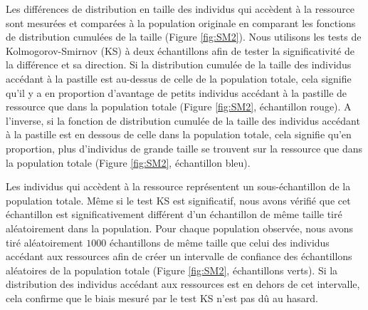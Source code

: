 Les différences de distribution en taille des individus qui accèdent à la
ressource sont mesurées et comparées à la population originale en comparant les
fonctions de distribution cumulées de la taille (Figure \ref{fig:SM2}). Nous
utilisons les tests de Kolmogorov-Smirnov (KS) à deux échantillons afin de
tester la significativité de la différence et sa direction. Si la distribution cumulée
de la taille des individus accédant à la pastille est au-dessus de celle de la
population totale, cela signifie qu'il y a en proportion d'avantage de petits
individus accédant à la pastille de ressource que dans la population totale
(Figure \ref{fig:SM2}, échantillon rouge). A l'inverse, si la fonction de
distribution cumulée de la taille des individus accédant à la pastille est en
dessous de celle dans la population totale, cela signifie qu'en proportion, plus
d'individus de grande taille se trouvent sur la ressource que dans la population
totale (Figure \ref{fig:SM2}, échantillon bleu).

Les individus qui accèdent à la ressource représentent un sous-échantillon de la
population totale. Même si le test KS est significatif, nous avons vérifié que
cet échantillon est significativement différent d'un échantillon de même taille
tiré aléatoirement dans la population. Pour chaque population observée, nous
avons tiré aléatoirement $1000$ échantillons de même taille que celui des
individus accédant aux ressources afin de créer un intervalle de confiance des
échantillons aléatoires de la population totale (Figure \ref{fig:SM2},
échantillons verts). Si la distribution des individus accédant aux ressources
est en dehors de cet intervalle, cela confirme que le biais mesuré par le test KS
n'est pas dû au hasard.




